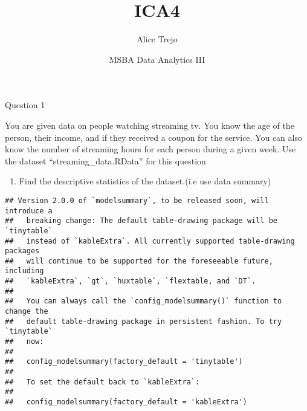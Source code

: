 \documentclass[
]{article}
\title{ICA4}
\author{Alice Trejo}
\date{MSBA Data Analytics III}
\newenvironment{Shaded}{\begin{snugshade}}{\end{snugshade}}
\newcommand{\DecValTok}[1]{\textcolor[rgb]{0.00,0.00,0.81}{#1}}
\newcommand{\FunctionTok}[1]{\textcolor[rgb]{0.13,0.29,0.53}{\textbf{#1}}}
\newcommand{\NormalTok}[1]{#1}
\newcommand{\OtherTok}[1]{\textcolor[rgb]{0.56,0.35,0.01}{#1}}
\newcommand{\SpecialCharTok}[1]{\textcolor[rgb]{0.81,0.36,0.00}{\textbf{#1}}}
\newcommand{\StringTok}[1]{\textcolor[rgb]{0.31,0.60,0.02}{#1}}
\providecommand{\tightlist}{%
  \setlength{\itemsep}{0pt}\setlength{\parskip}{0pt}}
\begin{document}
\maketitle

Question 1

You are given data on people watching streaming tv. You know the age of
the person, their income, and if they received a coupon for the service.
You can also know the number of streaming hours for each person during a
given week. Use the dataset ``streaming\_data.RData'' for this question

\begin{enumerate}
\def\labelenumi{\alph{enumi})}
\tightlist
\item
  Find the descriptive statistics of the dataset.(i.e use data summary)
\end{enumerate}

\begin{Shaded}
\end{Shaded}

\begin{verbatim}
## Version 2.0.0 of `modelsummary`, to be released soon, will introduce a
##   breaking change: The default table-drawing package will be `tinytable`
##   instead of `kableExtra`. All currently supported table-drawing packages
##   will continue to be supported for the foreseeable future, including
##   `kableExtra`, `gt`, `huxtable`, `flextable, and `DT`.
##   
##   You can always call the `config_modelsummary()` function to change the
##   default table-drawing package in persistent fashion. To try `tinytable`
##   now:
##   
##   config_modelsummary(factory_default = 'tinytable')
##   
##   To set the default back to `kableExtra`:
##   
##   config_modelsummary(factory_default = 'kableExtra')
\end{verbatim}
\end{document}
